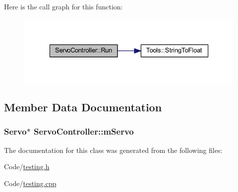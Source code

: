 \-Here is the call graph for this function\-:\nopagebreak
\begin{figure}[H]
\begin{center}
\leavevmode
\includegraphics[width=326pt]{class_servo_controller_adddcc501b5aa1f997cd276b3b6fe2a72_cgraph}
\end{center}
\end{figure}




\subsection{\-Member \-Data \-Documentation}
\hypertarget{class_servo_controller_a9efdfd24ddb51968e26dc61853011e3e}{
\subsubsection[{m\-Servo}]{\setlength{\rightskip}{0pt plus 5cm}\-Servo$\ast$ {\bf \-Servo\-Controller\-::m\-Servo}}}\label{class_servo_controller_a9efdfd24ddb51968e26dc61853011e3e}


\-The documentation for this class was generated from the following files\-:\begin{DoxyCompactItemize}
\item 
\-Code/\hyperlink{testing_8h}{testing.\-h}\item 
\-Code/\hyperlink{testing_8cpp}{testing.\-cpp}\end{DoxyCompactItemize}
